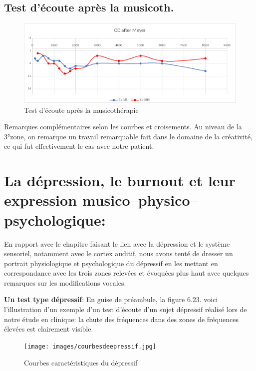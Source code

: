       


        
    	\subsection{Test d'écoute après la musicoth.}
 	
 	\begin{figure}[h]
 		\centering

 		\includegraphics[width=0.7\linewidth]{images/clinique/od_after_meyer.png}
 		\caption{Test d'écoute après la musicothérapie}
 		\label{fig:odaftermeyer}
 	\end{figure}
 
  Remarques complémentaires selon les courbes et
  croisements.
  Au niveau de la 3°zone, on remarque un travail remarquable fait dans
  le domaine de la créativité, ce qui fut effectivement le cas avec
  notre patient.
     







 




   
  \section{La dépression, le burnout et leur expression
    musico--physico--psychologique:}
 En rapport  avec le chapitre faisant le lien avec la dépression et le
système sensoriel, notamment avec le cortex auditif, nous
avons tenté de dresser un portrait
physiologique et psychologique du dépressif 
  en les mettant en correspondance avec les trois zones relevées et
  évoquées plus haut avec quelques remarques sur 
  les modifications vocales.

  \textbf{Un test type dépressif}: 
En guise de préambule, la figure 6.23. voici l'illustration d'un exemple d'un test
d'écoute d'un sujet dépressif réalisé lors de notre
étude en clinique: la
chute des fréquences dans des zones de fréquences élevées est
clairement visible.
 \begin{figure}
	\centering
	\texttt{[image: images/courbesdeepressif.jpg]}
	\caption{Courbes caractéristiques du dépressif}
	\label{fig:courbes du dépressif}
      \end{figure}




